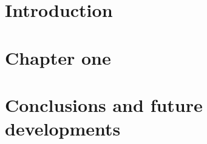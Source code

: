 \documentclass{Configuration_Files/PoliMi3i_thesis}
\begin{document}
%
%
%    
%

\mainmatter %

\chapter*{Introduction}


\chapter{Chapter one}
\label{ch:chapter_one}%


\chapter{Conclusions and future developments}
\label{ch:conclusions}%



\printbibliography
\end{document}

